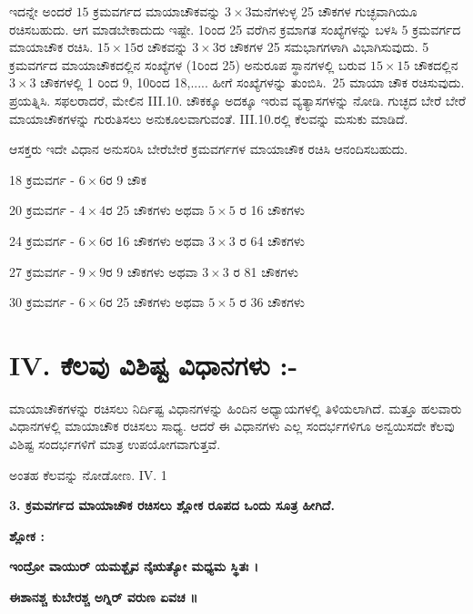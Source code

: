 	ಇದನ್ನೇ ಅಂದರೆ $15$ ಕ್ರಮವರ್ಗದ ಮಾಯಾಚೌಕವನ್ನು $3 \times 3$ಮನೆಗಳುಳ್ಳ 25 ಚೌಕಗಳ ಗುಚ್ಛವಾಗಿಯೂ ರಚಿಸಬಹುದು. ಆಗ ಮಾಡಬೇಕಾದುದು ಇಷ್ಟೇ. 1ರಿಂದ 25 ವರೆಗಿನ ಕ್ರಮಾ\-ಗತ ಸಂಖ್ಯೆಗಳನ್ನು ಬಳಸಿ $5$ ಕ್ರಮವರ್ಗದ ಮಾಯಾಚೌಕ ರಚಿಸಿ. $15 \times 15$ರ ಚೌಕ\-ವನ್ನು $3 \times 3$ರ ಚೌಕಗಳ 25 ಸಮಭಾಗಗಳಾಗಿ ವಿಭಾಗಿಸುವುದು. 5 ಕ್ರಮವರ್ಗದ ಮಾಯಾಚೌಕದಲ್ಲಿನ ಸಂಖ್ಯೆಗಳ (1ರಿಂದ 25) ಅನುರೂಪ ಸ್ಥಾನಗಳಲ್ಲಿ ಬರುವ $15 \times 15$ ಚೌಕ\-ದಲ್ಲಿನ $3 \times 3$ ಚೌಕಗಳಲ್ಲಿ 1 ರಿಂದ 9, 10ರಿಂದ 18,..... ಹೀಗೆ ಸಂಖ್ಯೆಗಳನ್ನು \hbox{ತುಂಬಿಸಿ. $25$} \break ಮಾಯಾ ಚೌಕ ರಚಿಸುವುದು. ಪ್ರಯತ್ನಿಸಿ. ಸಫಲರಾದರೆ, ಮೇಲಿನ  III.10. ಚೌಕಕ್ಕೂ \break ಅದಕ್ಕೂ ಇರುವ ವ್ಯತ್ಯಾಸಗಳನ್ನು ನೋಡಿ. ಗುಚ್ಛದ ಬೇರೆ ಬೇರೆ ಮಾಯಾಚೌಕಗಳನ್ನು ಗುರುತಿ\-ಸಲು ಅನುಕೂಲವಾಗುವಂತೆ.  III.10.ರಲ್ಲಿ ಕೆಲವನ್ನು ಮಸುಕು ಮಾಡಿದೆ.

	ಆಸಕ್ತರು ಇದೇ ವಿಧಾನ ಅನುಸರಿಸಿ ಬೇರೆಬೇರೆ ಕ್ರಮವರ್ಗಗಳ ಮಾಯಾಚೌಕ ರಚಿಸಿ ಆನಂದಿಸಬಹುದು.

	18 ಕ್ರಮವರ್ಗ - $6 \times 6$ರ 9 ಚೌಕ

	20 ಕ್ರಮವರ್ಗ - $4 \times 4$ರ 25 ಚೌಕಗಳು ಅಥವಾ $5 \times 5$ ರ 16 ಚೌಕಗಳು

	24 ಕ್ರಮವರ್ಗ - $6 \times 6$ರ 16 ಚೌಕಗಳು ಅಥವಾ $3 \times 3$ ರ 64 ಚೌಕಗಳು

	27 ಕ್ರಮವರ್ಗ - $9 \times 9$ರ 9 ಚೌಕಗಳು ಅಥವಾ $3 \times 3$ ರ 81 ಚೌಕಗಳು

	30 ಕ್ರಮವರ್ಗ - $6 \times 6$ರ 25 ಚೌಕಗಳು ಅಥವಾ $5 \times 5$ ರ 36 ಚೌಕಗಳು

\section*{IV. ಕೆಲವು ವಿಶಿಷ್ಟ ವಿಧಾನಗಳು :-}

ಮಾಯಾಚೌಕಗಳನ್ನು ರಚಿಸಲು ನಿರ್ದಿಷ್ಟ ವಿಧಾನಗಳನ್ನು ಹಿಂದಿನ ಅಧ್ಯಾಯಗಳಲ್ಲಿ ತಿಳಿಯಲಾಗಿದೆ. ಮತ್ತೂ ಹಲವಾರು ವಿಧಾನಗಳಲ್ಲಿ ಮಾಯಾಚೌಕ ರಚಿಸಲು ಸಾಧ್ಯ. ಆದರೆ ಈ ವಿಧಾನಗಳು ಎಲ್ಲ ಸಂದರ್ಭಗಳಿಗೂ ಅನ್ವಯಿಸದೇ ಕೆಲವು ವಿಶಿಷ್ಟ ಸಂದರ್ಭಗಳಿಗೆ ಮಾತ್ರ ಉಪಯೋಗವಾಗುತ್ತವೆ.

ಅಂತಹ ಕೆಲವನ್ನು ನೋಡೋಣ. IV. 1

\noindent \textbf{3. ಕ್ರಮವರ್ಗದ ಮಾಯಾಚೌಕ ರಚಿಸಲು ಶ್ಲೋಕ ರೂಪದ ಒಂದು ಸೂತ್ರ ಹೀಗಿದೆ.}

\noindent \textbf{ಶ್ಲೋಕ :}

\textbf{ಇಂದ್ರೋ ವಾಯುರ್ ಯಮಶ್ಬೈವ ನೈಋತ್ಯೋ ಮಧ್ಯಮ ಸ್ಥಿತಃ ।}

\textbf{ಈಶಾನಶ್ಚ ಕುಬೇರಶ್ಚ ಅಗ್ನಿರ್ ವರುಣ ಏವಚ ॥}

